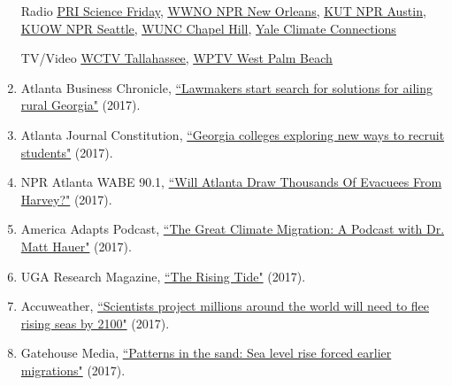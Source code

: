 \begin{enumerate}
    Radio
        \href{http://www.sciencefriday.com/segments/are-we-ready-for-a-climate-change-refugee-crisis/}{\underline{PRI Science Friday}},
        \href{http://wwno.org/post/research-predicts-huge-migration-away-coasts}{\underline{WWNO NPR New Orleans}},
        \href{http://kut.org/post/quarter-million-people-fleeing-sea-level-rise-could-end-austin-study-says}{\underline{KUT NPR Austin}},
        \href{http://kuow.org/post/quarter-million-people-fleeing-sea-level-rise-could-end-austin-study-says}{\underline{KUOW NPR Seattle}},
        \href{http://wunc.org/post/report-inland-cities-could-see-influx-residents-sea-level-rises}{\underline{WUNC Chapel Hill}},
        \href{https://www.yaleclimateconnections.org/2017/12/where-americans-will-move-as-seas-rise/}{\underline{Yale Climate Connections}}
        
    
    TV/Video
        \href{http://www.wctv.tv/content/news/Sea-level-rise-could-cause-mass-migration-420553793.html}{\underline{WCTV Tallahassee}},
        \href{http://www.wptv.com/newsy/climate-change-is-accelerating-gentrification-in-some-us-cities}{\underline{WPTV West Palm Beach}}
        
    \item Atlanta Business Chronicle, \href{http://www.bizjournals.com/atlanta/news/2017/05/22/lawmakers-start-search-for-solutions-for-ailing.html}{``Lawmakers start search for solutions for ailing rural Georgia"} (2017).
    \item Atlanta Journal Constitution, \href{http://www.ajc.com/news/local-education/georgia-colleges-exploring-new-ways-recruit-students/bA8IIiTLyCCFjLiEFZ8fjI/}{``Georgia colleges exploring new ways to recruit students"} (2017).
    \item NPR Atlanta WABE 90.1,
    \href{http://news.wabe.org/post/will-atlanta-draw-thousands-evacuees-harvey}{``Will Atlanta Draw Thousands Of Evacuees From Harvey?"} (2017).
    \item America Adapts Podcast, \href{http://americaadapts.org/2017/10/13/the-great-climate-migration-a-podcast-with-dr-matt-hauer/}{``The Great Climate Migration: A Podcast with Dr. Matt Hauer"} (2017).
    \item UGA Research Magazine, \href{https://ugaresearch.uga.edu/the-rising-tide/}{``The Rising Tide"} (2017).
    \item Accuweather, \href{https://www.accuweather.com/en/weather-news/scientists-project-millions-around-the-world-will-need-to-flee-rising-seas-by-2100/70003300}{``Scientists project millions around the world will need to flee rising seas by 2100"} (2017).
    \item Gatehouse Media, \href{http://gatehouseprojects.com/risingseas/coastal-migration/}{``Patterns in the sand: Sea level rise forced earlier migrations"} (2017).
\end{enumerate}